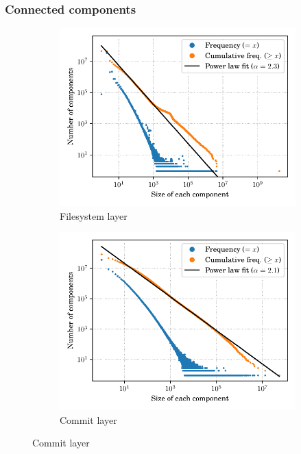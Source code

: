 \documentclass[aspectratio=169,xcolor=table]{beamer}
\begin{document}
    \begin{frame}
        \frametitle{Connected components}
        \begin{figure}
            \begin{subfigure}{.49\textwidth}
                \centering
                \includegraphics[width=0.9\linewidth]{../img/topology/connectedcomponents/dir+cnt}
                \caption{Filesystem layer}
            \end{subfigure}\hfill
            \begin{subfigure}{.49\textwidth}
                \centering
                \includegraphics[width=0.9\linewidth]{../img/topology/connectedcomponents/rev}
                \caption{Commit layer}
            \end{subfigure}
        \end{figure}


\end{frame}
\end{document}
